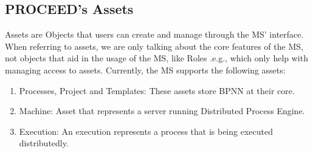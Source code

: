%
%
%
%
%

\subsection{PROCEED's Assets}
\label{cha:relatedwork:proceed-assets}

Assets are Objects that users can create and manage through the MS' interface.
When referring to assets, we are only talking about the core features of the MS, not
objects that aid in the usage of the MS, like Roles .e.g., which only help with managing
access to assets.
Currently, the MS supports the following assets:

\begin{enumerate}
	\item Processes, Project and Templates: These assets store BPNN at their core.
	\item Machine: Asset that represents a server running Distributed Process Engine. 
	\item Execution: An execution represents a process that is being executed distributedly.
\end{enumerate}

